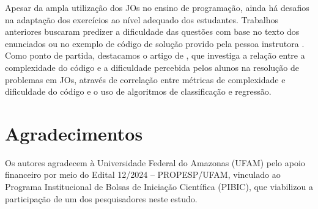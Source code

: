 \documentclass[12pt]{article}
\begin{document}
Apesar da ampla utilização dos JOs no ensino de programação, ainda há desafios na adaptação dos exercícios ao nível adequado dos estudantes. Trabalhos anteriores buscaram predizer a dificuldade das questões com base no texto dos enunciados \cite{santos2019} ou no exemplo de código de solução provido pela pessoa instrutora \cite{marcos2021,elrik2022}. Como ponto de partida, destacamos o artigo de \cite{jackson2023}, que  investiga a relação entre a complexidade do código e a dificuldade percebida pelos alunos na resolução de problemas em JOs, através de correlação entre métricas de complexidade e dificuldade do código e o uso de algoritmos de classificação e regressão.

\section*{Agradecimentos}

Os autores agradecem à Universidade Federal do Amazonas (UFAM) pelo apoio financeiro por meio do Edital 12/2024 -- PROPESP/UFAM, vinculado ao Programa Institucional de Bolsas de Iniciação Científica (PIBIC), que viabilizou a participação de um dos pesquisadores neste estudo.



\end{document}
